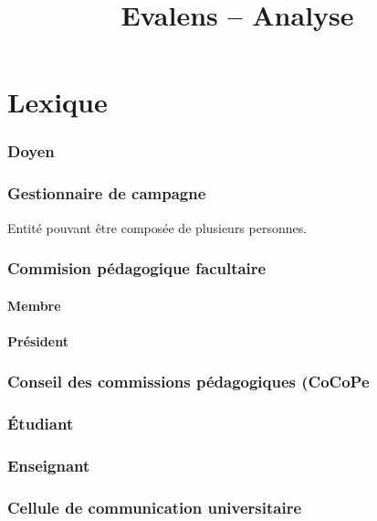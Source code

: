 \documentclass[a4paper,11pt]{report}
\title{Evalens -- Analyse}
\date{}
\begin{document}
\maketitle
\tableofcontents

\chapter{Lexique}

\subsection{Doyen}

\subsection{Gestionnaire de campagne}
Entité pouvant être composée de plusieurs personnes.

\subsection{Commision pédagogique facultaire}
\subsubsection{Membre}
\subsubsection{Président}

\subsection{Conseil des commissions pédagogiques (CoCoPe}


\subsection{Étudiant}

\subsection{Enseignant}

\subsection{Cellule de communication universitaire}
\end{document}
